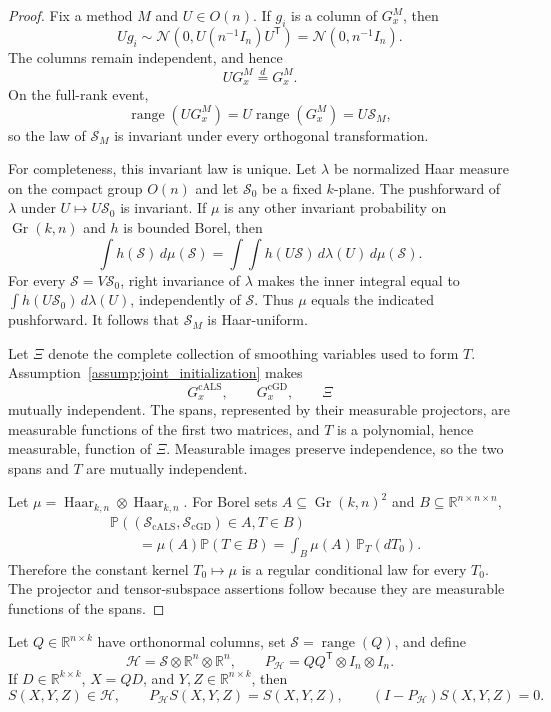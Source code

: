 \begin{proof}
Fix a method $M$ and $U\in O(n)$.  If $g_i$ is a column of $G_x^M$, then
\[
 Ug_i\sim\mathcal N\!\left(0,U(n^{-1}I_n)U^{\mathsf T}\right)
 =\mathcal N(0,n^{-1}I_n).
\]
The columns remain independent, and hence
\[
 UG_x^M\stackrel{d}=G_x^M.
\]
On the full-rank event,
\[
 \operatorname{range}(UG_x^M)=U\operatorname{range}(G_x^M)=U\mathcal S_M,
\]
so the law of $\mathcal S_M$ is invariant under every orthogonal
transformation.

For completeness, this invariant law is unique.  Let $\lambda$ be normalized
Haar measure on the compact group $O(n)$ and let $\mathcal S_0$ be a fixed
$k$-plane.  The pushforward of $\lambda$ under $U\mapsto U\mathcal S_0$ is
invariant.  If $\mu$ is any other invariant probability on
$\operatorname{Gr}(k,n)$ and $h$ is bounded Borel, then
\[
 \int h(\mathcal S)\,d\mu(\mathcal S)
 =\int\!\int h(U\mathcal S)\,d\lambda(U)\,d\mu(\mathcal S).
\]
For every $\mathcal S=V\mathcal S_0$, right invariance of $\lambda$ makes
the inner integral equal to
$\int h(U\mathcal S_0)\,d\lambda(U)$, independently of $\mathcal S$.
Thus $\mu$ equals the indicated pushforward.  It follows that
$\mathcal S_M$ is Haar-uniform.

Let $\Xi$ denote the complete collection of smoothing variables used to form
$T$.  Assumption~\ref{assump:joint_initialization} makes
\[
 G_x^{\mathrm{cALS}},\qquad G_x^{\mathrm{cGD}},\qquad\Xi
\]
mutually independent.  The spans, represented by their measurable
projectors, are measurable functions of the first two matrices, and $T$ is a
polynomial, hence measurable, function of $\Xi$.  Measurable images preserve
independence, so the two spans and $T$ are mutually independent.

Let $\mu=\operatorname{Haar}_{k,n}\otimes\operatorname{Haar}_{k,n}$.
For Borel sets $A\subseteq\operatorname{Gr}(k,n)^2$ and
$B\subseteq\mathbb R^{n\times n\times n}$,
\[
 \begin{aligned}
 &\mathbb P\!\left(
 (\mathcal S_{\mathrm{cALS}},\mathcal S_{\mathrm{cGD}})\in A,
 T\in B\right)\\
 &\qquad=\mu(A)\mathbb P(T\in B)
 =\int_B\mu(A)\,\mathbb P_T(dT_0).
 \end{aligned}
\]
Therefore the constant kernel $T_0\mapsto\mu$ is a regular conditional law
for every $T_0$.  The projector and tensor-subspace assertions follow because
they are measurable functions of the spans.
\end{proof}

\begin{lemma}\label{lem:step-001-tensor-lift}
Let $Q\in\mathbb R^{n\times k}$ have orthonormal columns, set
$\mathcal S=\operatorname{range}(Q)$, and define
\[
 \mathcal H=\mathcal S\otimes\mathbb R^n\otimes\mathbb R^n,
 \qquad
 P_{\mathcal H}=QQ^{\mathsf T}\otimes I_n\otimes I_n.
\]
If $D\in\mathbb R^{k\times k}$, $X=QD$, and
$Y,Z\in\mathbb R^{n\times k}$, then
\[
 S(X,Y,Z)\in\mathcal H,
 \qquad
 P_{\mathcal H}S(X,Y,Z)=S(X,Y,Z),
 \qquad
 (I-P_{\mathcal H})S(X,Y,Z)=0.
\]
\end{lemma}

